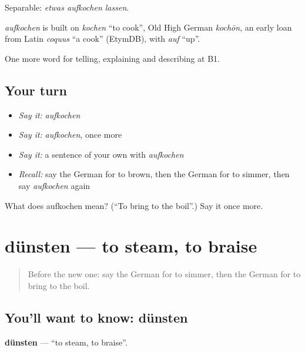 Separable: \emph{etwas aufkochen lassen}.

\begin{cousinweb}
\emph{aufkochen} is built on \emph{kochen} \textquotedblleft{}to cook\textquotedblright{}, Old High German \emph{kochōn}, an early loan from Latin \emph{coquus} \textquotedblleft{}a cook\textquotedblright{} (EtymDB), with \emph{auf} \textquotedblleft{}up\textquotedblright{}.
\end{cousinweb}

\begin{grammarlens}[title={What you've built}]
One more word for telling, explaining and describing at B1.
\end{grammarlens}

\subsection*{Your turn}
\begin{itemize}
\raggedright
  \item \emph{Say it:} \emph{aufkochen}
  \item \emph{Say it:} \emph{aufkochen}, once more
  \item \emph{Say it:} a sentence of your own with \emph{aufkochen}
  \item \emph{Recall:} say the German for to brown, then the German for to simmer, then say \emph{aufkochen} again
\end{itemize}

\begin{tcolorbox}[breakable,colback=teal!4,colframe=teal!35!black,title={Before you move on}]
What does aufkochen mean? (\textquotedblleft{}To bring to the boil\textquotedblright{}.) Say it once more.
\end{tcolorbox}
\section[dünsten]{dünsten — to steam, to braise}

\label{lesson:GE-C327-duensten}



\begin{quote}
Before the new one: say the German for to simmer, then the German for to bring to the boil.
\end{quote}

\subsection*{You'll want to know: dünsten}
\textbf{dünsten} — \textquotedblleft{}to steam, to braise\textquotedblright{}.

